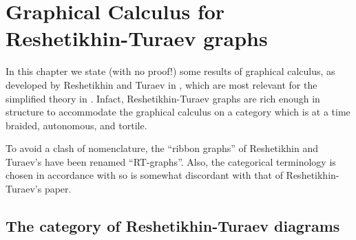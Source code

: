 

\chapter{Graphical Calculus for Reshetikhin-Turaev graphs}
\label{cha:rt}

In this chapter we state (with no proof!) some results of graphical
calculus, as developed by Reshetikhin and Turaev in
\cite{reshetikhin-turaev;ribbon-graphs}, which are most relevant for
the simplified theory in . Infact, Reshetikhin-Turaev
graphs are rich enough in structure to accommodate the graphical
calculus on a category which is at a time braided, autonomous, and
tortile.

To avoid a clash of nomenclature, the ``ribbon graphs'' of Reshetikhin
and Turaev's \cite{reshetikhin-turaev;ribbon-graphs} have been renamed
``RT-graphs''. Also, the categorical terminology is chosen in
accordance with  so is somewhat discordant with that of
Reshetikhin-Turaev's paper.

\section{The category of Reshetikhin-Turaev diagrams} 
\label{sec:rt-diagrams}

